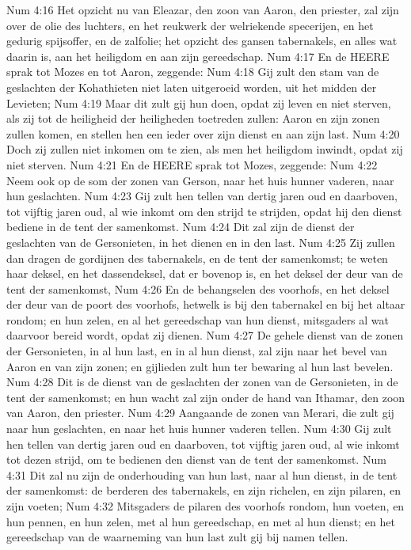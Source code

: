 Num 4:16  Het opzicht nu van Eleazar, den zoon van Aaron, den priester, zal zijn over de olie des luchters, en het reukwerk der welriekende specerijen, en het gedurig spijsoffer, en de zalfolie; het opzicht des gansen tabernakels, en alles wat daarin is, aan het heiligdom en aan zijn gereedschap.
Num 4:17  En de HEERE sprak tot Mozes en tot Aaron, zeggende:
Num 4:18  Gij zult den stam van de geslachten der Kohathieten niet laten uitgeroeid worden, uit het midden der Levieten;
Num 4:19  Maar dit zult gij hun doen, opdat zij leven en niet sterven, als zij tot de heiligheid der heiligheden toetreden zullen: Aaron en zijn zonen zullen komen, en stellen hen een ieder over zijn dienst en aan zijn last.
Num 4:20  Doch zij zullen niet inkomen om te zien, als men het heiligdom inwindt, opdat zij niet sterven.
Num 4:21  En de HEERE sprak tot Mozes, zeggende:
Num 4:22  Neem ook op de som der zonen van Gerson, naar het huis hunner vaderen, naar hun geslachten.
Num 4:23  Gij zult hen tellen van dertig jaren oud en daarboven, tot vijftig jaren oud, al wie inkomt om den strijd te strijden, opdat hij den dienst bediene in de tent der samenkomst.
Num 4:24  Dit zal zijn de dienst der geslachten van de Gersonieten, in het dienen en in den last.
Num 4:25  Zij zullen dan dragen de gordijnen des tabernakels, en de tent der samenkomst; te weten haar deksel, en het dassendeksel, dat er bovenop is, en het deksel der deur van de tent der samenkomst,
Num 4:26  En de behangselen des voorhofs, en het deksel der deur van de poort des voorhofs, hetwelk is bij den tabernakel en bij het altaar rondom; en hun zelen, en al het gereedschap van hun dienst, mitsgaders al wat daarvoor bereid wordt, opdat zij dienen.
Num 4:27  De gehele dienst van de zonen der Gersonieten, in al hun last, en in al hun dienst, zal zijn naar het bevel van Aaron en van zijn zonen; en gijlieden zult hun ter bewaring al hun last bevelen.
Num 4:28  Dit is de dienst van de geslachten der zonen van de Gersonieten, in de tent der samenkomst; en hun wacht zal zijn onder de hand van Ithamar, den zoon van Aaron, den priester.
Num 4:29  Aangaande de zonen van Merari, die zult gij naar hun geslachten, en naar het huis hunner vaderen tellen.
Num 4:30  Gij zult hen tellen van dertig jaren oud en daarboven, tot vijftig jaren oud, al wie inkomt tot dezen strijd, om te bedienen den dienst van de tent der samenkomst.
Num 4:31  Dit zal nu zijn de onderhouding van hun last, naar al hun dienst, in de tent der samenkomst: de berderen des tabernakels, en zijn richelen, en zijn pilaren, en zijn voeten;
Num 4:32  Mitsgaders de pilaren des voorhofs rondom, hun voeten, en hun pennen, en hun zelen, met al hun gereedschap, en met al hun dienst; en het gereedschap van de waarneming van hun last zult gij bij namen tellen.
